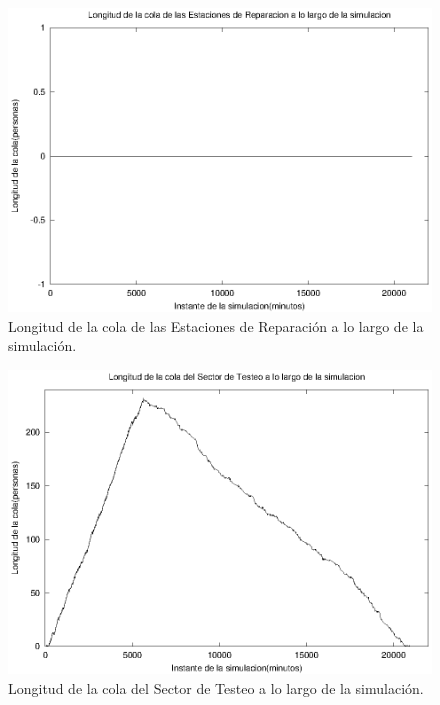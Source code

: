 \documentclass[a4paper,10pt]{article}
\begin{document}
\begin{figure}[ht]
\begin{center}
\includegraphics[width=15cm]{./img/cola_ER.eps}
\caption{\label{fig:cola_ER} Longitud de la cola de las Estaciones de Reparaci\'on a lo largo de la simulaci\'on.}
\end{center}
\end{figure}

\begin{figure}[ht]
\begin{center}
\includegraphics[width=15cm]{./img/cola_ST.eps}
\caption{\label{fig:cola_ST} Longitud de la cola del Sector de Testeo a lo largo de la simulaci\'on.}
\end{center}
\end{figure}
\end{document}
